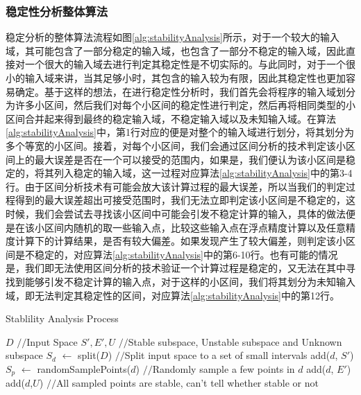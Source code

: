 \subsubsection{稳定性分析整体算法}

稳定分析的整体算法流程如图\ref{alg:stabilityAnalysis}所示，对于一个较大的输入域，其可能包含了一部分稳定的输入域，也包含了一部分不稳定的输入域，因此直接对一个很大的输入域去进行判定其稳定性是不切实际的。与此同时，对于一个很小的输入域来讲，当其足够小时，其包含的输入较为有限，因此其稳定性也更加容易确定。基于这样的想法，在进行稳定性分析时，我们首先会将程序的输入域划分为许多小区间，然后我们对每个小区间的稳定性进行判定，然后再将相同类型的小区间合并起来得到最终的稳定输入域，不稳定输入域以及未知输入域。在算法\ref{alg:stabilityAnalysis}中，第1行对应的便是对整个的输入域进行划分，将其划分为多个等宽的小区间。接着，对每个小区间，我们会通过区间分析的技术判定该小区间上的最大误差是否在一个可以接受的范围内，如果是，我们便认为该小区间是稳定的，将其列入稳定的输入域，这一过程对应算法\ref{alg:stabilityAnalysis}中的第3-4行。由于区间分析技术有可能会放大该计算过程的最大误差，所以当我们的判定过程得到的最大误差超出可接受范围时，我们无法立即判定该小区间是不稳定的，这时候，我们会尝试去寻找该小区间中可能会引发不稳定计算的输入，具体的做法便是在该小区间内随机的取一些输入点，比较这些输入点在浮点精度计算以及任意精度计算下的计算结果，是否有较大偏差。如果发现产生了较大偏差，则判定该小区间是不稳定的，对应算法\ref{alg:stabilityAnalysis}中的第6-10行。也有可能的情况是，我们即无法使用区间分析的技术验证一个计算过程是稳定的，又无法在其中寻找到能够引发不稳定计算的输入点，对于这样的小区间，我们将其划分为未知输入域，即无法判定其稳定性的区间，对应算法\ref{alg:stabilityAnalysis}中的第12行。
\begin{algorithm}[thb]
  \caption{Stablility Analysis Process}
  \label{alg:stabilityAnalysis}
\begin{algorithmic}[1]
\REQUIRE $D$ {{\footnotesize$//$}\small Input Space}
\ENSURE $S', E', U$ {{\footnotesize$//$}\small Stable subspace, Unstable subspace and Unknown subspace}
\STATE $S_d$ $\leftarrow$ split($D$) {{\footnotesize$//$}\small Split input space to a set of small intervals}
\STATE add($d$, $S'$)
\ELSE
\STATE $S_p$ $\leftarrow$ randomSamplePoints($d$) {{\footnotesize$//$}\small Randomly sample a few points in $d$}
\STATE add($d$, $E'$)
\ENDIF
\ENDFOR
\STATE add($d$,$U$) {{\footnotesize$//$}\small All sampled points are stable, can't tell whether stable or not}
\ENDIF
\ENDFOR
\end{algorithmic}
\end{algorithm}

